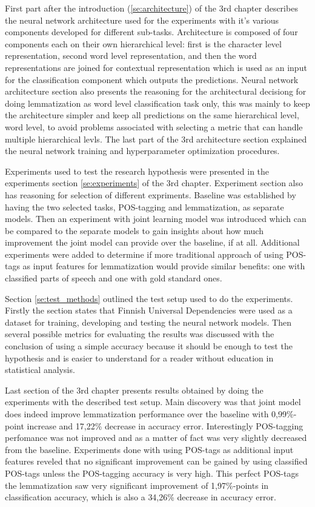 \documentclass[12pt,a4paper,english
]{tutthesis}
\begin{document}
First part after the introduction (\ref{se:architecture}) of the 3rd chapter describes the neural network architecture used for the experiments with it's various components developed for different sub-tasks. Architecture is composed of four components each on their own hierarchical level: first is the character level representation, second word level representation, and then the word representations are joined for contextual representation which is used as an input for the classification component which outputs the predictions. Neural network architecture section also presents the reasoning for the architectural decisiong for doing lemmatization as word level classification task only, this was mainly to keep the architecture simpler and keep all predictions on the same hierarchical level, word level, to avoid problems associated with selecting a metric that can handle multiple hierarchical levls. The last part of the 3rd architecture section explained the neural network training and hyperparameter optimization procedures.

Experiments used to test the research hypothesis were presented in the experiments section \ref{se:experiments} of the 3rd chapter. Experiment section also has reasoning for selection of different expriments. Baseline was established by having the two selected tasks, POS-tagging and lemmatization, as separate models. Then an experiment with joint learning model was introduced which can be compared to the separate models to gain insights about how much improvement the joint model can provide over the baseline, if at all. Additional experiments were added to determine if more traditional approach of using POS-tags as input features for lemmatization would provide similar benefits: one with classified parts of speech and one with gold standard ones.

Section \ref{se:test_methods} outlined the test setup used to do the experiments. Firstly the section states that Finnish Universal Dependencies were used as a dataset for training, developing and testing the neural network models. Then several possible metrics for evaluating the results was discussed with the conclusion of using a simple accuracy because it should be enough to test the hypothesis and is easier to understand for a reader without education in statistical analysis.

Last section of the 3rd chapter presents results obtained by doing the experiments with the described test setup. Main discovery was that joint model does indeed improve lemmatization performance over the baseline with 0,99\%-point increase and 17,22\% decrease in accuracy error. Interestingly POS-tagging perfomance was not improved and as a matter of fact was very slightly decreased from the baseline. Experiments done with using POS-tags as additional input features reveled that no significant improvement can be gained by using classified POS-tags unless the POS-tagging accuracy is very high. This perfect POS-tags the lemmatization saw very significant improvement of 1,97\%-points in classification accuracy, which is also a 34,26\% decrease in accuracy error.
\end{document}
